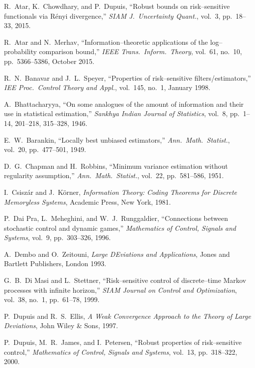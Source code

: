\documentclass[11pt,epsf]{article}
\begin{document}
\newpage
\begin{thebibliography}{AA}

R.~Atar, K.~Chowdhary, and P.~Dupuis,
``Robust bounds on risk--sensitive functionals via {R}\'{e}nyi
divergence,''
{\em SIAM J.\ Uncertainty Quant.}, vol.\ 3, pp.\ 18--33, 2015.

R.~Atar and N.~Merhav, ``Information--theoretic applications of the
log--probability comparison bound,'' {\it IEEE Trans.\
Inform.\ Theory},
vol.\ 61, no.\ 10, pp.\ 5366--5386, October 2015.

R.~N.~Banavar and J.~L.~Speyer, ``Properties of risk--sensitive
filters/estimators,'' {\it IEE Proc.\ Control Theory and Appl.}, vol.\ 145,
no.\ 1, January 1998.

A.~Bhattacharyya, ``On some analogues of the amount of information and their
use in statistical estimation,'' {\it Sankhya Indian Journal of Statistics},
vol.\ 8, pp.\ 1--14, 201--218, 315--328, 1946.

E.~W.~Barankin, ``Locally best unbiased estimators,''
{\it Ann.\ Math.\ Statist.}, vol.\ 20, pp.\ 477--501, 1949.

D.~G.~Chapman and H.~Robbins, ``Minimum variance estimation without regularity
assumption,'' {\it Ann.\ Math.\ Statist.}, vol.\ 22, pp.\ 581--586, 1951.

I.~Csisz\'ar and J.~K\"orner, 
{\it Information Theory: Coding Theorems for Discrete Memoryless Systems},
Academic Press, New York, 1981.

P.~Dai Pra, L.~Meheghini, and W.~J.~Runggaldier, ``Connections between
stochastic control and dynamic games,'' {\it Mathematics of Control, Signals
and Systems}, vol.\ 9, pp.\ 303--326, 1996.

A.~Dembo and O.~Zeitouni, {\it Large DEviations and Applications}, Jones and
Bartlett Publishers, London 1993.

G.~B.~Di Masi and L.~Stettner, ``Risk--sensitive control of discrete--time
Markov processes with infinite horizon,'' {\it SIAM Journal on Control and
Optimization}, vol.\ 38, no.\ 1, pp.\ 61--78, 1999.

P.~Dupuis and R.~S.~Ellis, {\it A Weak Convergence
Approach to the Theory of Large Deviations}, John Wiley \& Sons, 1997.

P.~Dupuis, M.~R.~James, and I.~Petersen, ``Robust properties of
risk--sensitive control,'' {\it
Mathematics of Control, Signals and Systems}, vol.\ 13, pp.\ 318--322, 2000.


\end{thebibliography}
\end{document}
